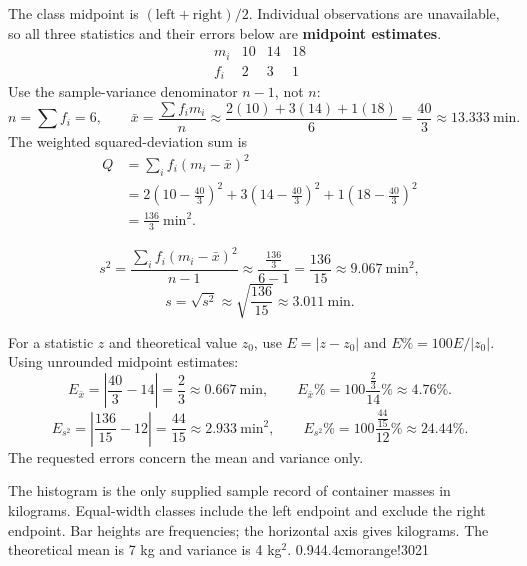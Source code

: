 
The class midpoint is $(\text{left}+\text{right})/2$. Individual observations are unavailable, so all three statistics and their errors below are \textbf{midpoint estimates}.\[\begin{array}{c|rrr}m_i&10&14&18\\\hline f_i&2&3&1\end{array}\]
Use the sample-variance denominator $n-1$, not $n$:
\[n=\sum f_i=6,\qquad\bar x=\frac{\sum f_im_i}{n}\approx\frac{2(10)+3(14)+1(18)}{6}=\frac{40}{3}\approx13.333\ \mathrm{min}.\]
The weighted squared-deviation sum is
\[\begin{aligned}Q&=\sum_i f_i(m_i-\bar x)^2\\&=2\left(10-\frac{40}{3}\right)^2+3\left(14-\frac{40}{3}\right)^2+1\left(18-\frac{40}{3}\right)^2\\&=\frac{136}{3}\ \mathrm{min}^2.\end{aligned}\]
\begin{samepage}\[s^2=\frac{\sum_i f_i(m_i-\bar x)^2}{n-1}\approx\frac{\frac{136}{3}}{6-1}=\frac{136}{15}\approx9.067\ \mathrm{min}^2,\]
\[s=\sqrt{s^2}\approx\sqrt{\frac{136}{15}}\approx3.011\ \mathrm{min}.\]\end{samepage}


For a statistic $z$ and theoretical value $z_0$, use $E=|z-z_0|$ and $E\%=100E/|z_0|$.
Using unrounded midpoint estimates:
\[E_{\bar x}=\left|\frac{40}{3}-14\right|=\frac{2}{3}\approx0.667\ \mathrm{min},\qquad
E_{\bar x}\%=100\frac{\frac{2}{3}}{14}\%\approx4.76\%.\]
\[E_{s^2}=\left|\frac{136}{15}-12\right|=\frac{44}{15}\approx2.933\ \mathrm{min}^2,\qquad
E_{s^2}\%=100\frac{\frac{44}{15}}{12}\%\approx24.44\%.\]
The requested errors concern the mean and variance only.

The histogram is the only supplied sample record of container masses in kilograms. Equal-width classes include the left endpoint and exclude the right endpoint. Bar heights are frequencies; the horizontal axis gives kilograms. The theoretical mean is 7 kg and variance is 4 kg$^2$.
{0.94\linewidth}{4.4cm}{orange!30}{2}{1}


